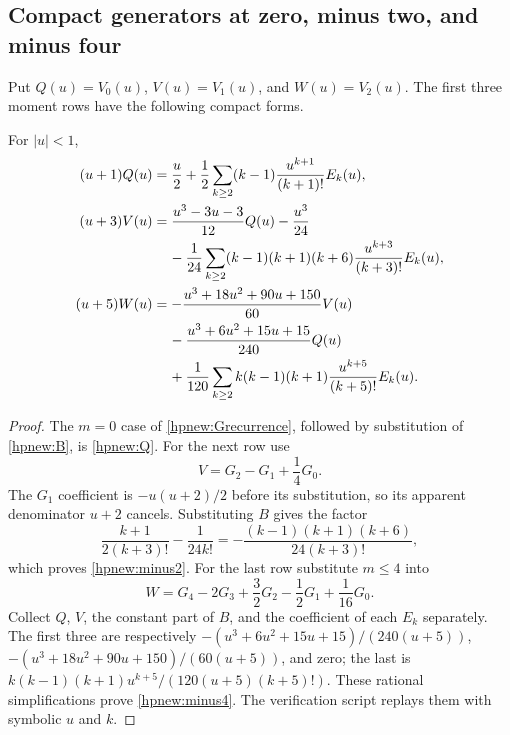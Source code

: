 \subsection{Compact generators at zero, minus two, and minus four}

Put $Q(u)=V_0(u)$, $V(u)=V_1(u)$, and $W(u)=V_2(u)$.
The first three moment rows have the following compact forms.
\begin{corollary}
\label{hpnew:threerows}
For $|u|<1$,
\begin{align}
 (u+1)Q(u)
 &=\frac u2+\frac12\sum_{k\ge2}(k-1)
                  \frac{u^{k+1}}{(k+1)!}E_k(u),\label{hpnew:Q}\\
 (u+3)V(u)
 &=\frac{u^3-3u-3}{12}Q(u)-\frac{u^3}{24}\notag\\
 &\hspace{4mm}-\frac1{24}\sum_{k\ge2}(k-1)(k+1)(k+6)
                  \frac{u^{k+3}}{(k+3)!}E_k(u),\label{hpnew:minus2}\\
 (u+5)W(u)
 &=-\frac{u^3+18u^2+90u+150}{60}V(u)\notag\\
 &\hspace{4mm}-\frac{u^3+6u^2+15u+15}{240}Q(u)\notag\\
 &\hspace{4mm}+\frac1{120}\sum_{k\ge2}k(k-1)(k+1)
                  \frac{u^{k+5}}{(k+5)!}E_k(u).
                                      \label{hpnew:minus4}
\end{align}
\end{corollary}

\begin{proof}
The $m=0$ case of \eqref{hpnew:Grecurrence}, followed by substitution
of \eqref{hpnew:B}, is \eqref{hpnew:Q}. For the next row use
\[
 V=G_2-G_1+\frac14G_0.
\]
The $G_1$ coefficient is $-u(u+2)/2$ before its substitution, so its
apparent denominator $u+2$ cancels. Substituting $B$ gives the factor
\[
 \frac{k+1}{2(k+3)!}-\frac1{24k!}
       =-\frac{(k-1)(k+1)(k+6)}{24(k+3)!},
\]
which proves \eqref{hpnew:minus2}.
For the last row substitute $m\le4$ into
\[
 W=G_4-2G_3+\frac32G_2-\frac12G_1+\frac1{16}G_0.
\]
Collect $Q$, $V$, the constant part of $B$, and the coefficient of
each $E_k$ separately. The first three are respectively
$-(u^3+6u^2+15u+15)/(240(u+5))$,
$-(u^3+18u^2+90u+150)/(60(u+5))$, and zero; the last is
$k(k-1)(k+1)u^{k+5}/(120(u+5)(k+5)!)$.
These rational simplifications prove \eqref{hpnew:minus4}. The
verification script replays them with symbolic $u$ and $k$.
\end{proof}

